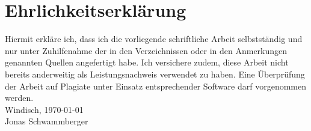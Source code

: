 \section{Ehrlichkeitserklärung}
Hiermit erkläre ich, dass ich die vorliegende schriftliche Arbeit
selbstständig und nur unter Zuhilfenahme der in den Verzeichnissen oder
in den Anmerkungen genannten Quellen angefertigt habe. Ich versichere
zudem, diese Arbeit nicht bereits anderweitig als Leistungsnachweis
verwendet zu haben. Eine Überprüfung der Arbeit auf Plagiate unter
Einsatz entsprechender Software darf vorgenommen werden.\\
Windisch, \today\\[4\baselineskip]
Jonas Schwammberger 